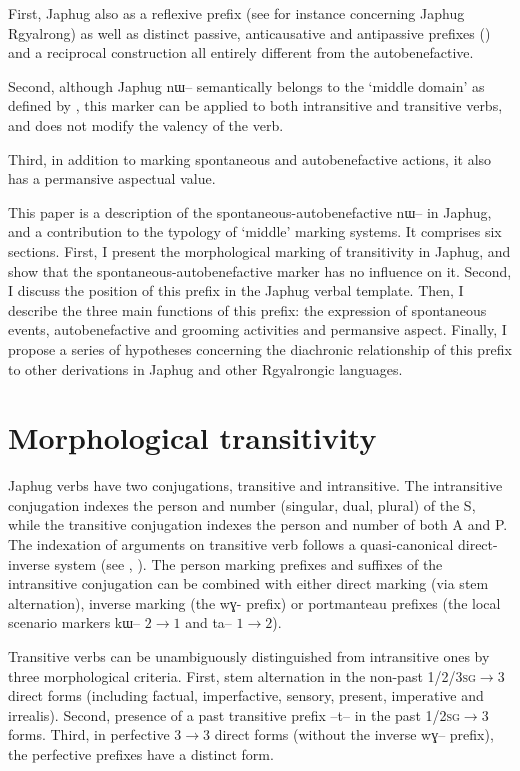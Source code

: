 \documentclass[oldfontcommands,oneside,a4paper,11pt]{article}
\newcommand{\ipa}[1]{{\phon \mbox{#1}}} %
\begin{document}
First, Japhug also as a  reflexive prefix (see for instance \citealt{jacques10refl} concerning Japhug Rgyalrong) as well as distinct passive, anticausative and antipassive prefixes (\citealt{jacques12demotion}) and a reciprocal construction all entirely different from the autobenefactive.


Second, although Japhug  \ipa{nɯ--}  semantically belongs to the ‘middle domain’ as defined by \citet[15]{kemmer93middle}, this marker can be applied to both intransitive and transitive verbs,  and does not modify the valency of the verb.
 
 Third, in addition to marking spontaneous and autobenefactive actions, it also has a permansive aspectual value.
 
 
 This paper is a description of the spontaneous-autobenefactive  \ipa{nɯ--}  in Japhug, and a contribution to the typology of ‘middle’ marking systems. It comprises six sections. First, I present the morphological marking  of transitivity in Japhug, and show that the spontaneous-autobenefactive marker has no influence on it. Second, I discuss the position of this prefix  in the Japhug verbal template. Then, I describe the three main functions of this prefix: the expression of spontaneous events, autobenefactive and grooming activities and  permansive aspect. Finally, I propose a series of hypotheses concerning the diachronic relationship of this prefix to other derivations in Japhug and other Rgyalrongic languages. 
 

\section{Morphological transitivity}

Japhug verbs have two conjugations, transitive and intransitive. The intransitive conjugation indexes the person and number (singular, dual, plural) of the S, while the transitive conjugation indexes the person and number of both A and P. The indexation of arguments on transitive verb follows a quasi-canonical direct-inverse system (see \citealt{jacques10inverse}, \citealt{jacques14inverse}). The person marking prefixes and suffixes of the intransitive conjugation can be combined with either direct marking (via stem alternation), inverse marking (the \ipa{wɣ-} prefix) or portmanteau prefixes (the local scenario markers \ipa{kɯ--} $2\rightarrow1$ and \ipa{ta--} $1\rightarrow2$).

Transitive verbs can be unambiguously distinguished from intransitive ones by three morphological criteria. First, stem alternation in the non-past  \textsc{1/2/3sg}$\rightarrow$3 direct forms (including factual, imperfactive, sensory, present, imperative and irrealis). Second, presence of a past transitive prefix \ipa{--t--} in the past \textsc{1/2sg}$\rightarrow$3 forms. Third, in perfective 3$\rightarrow$3 direct forms (without the inverse \ipa{wɣ--} prefix), the perfective prefixes have a distinct form.
\end{document}
